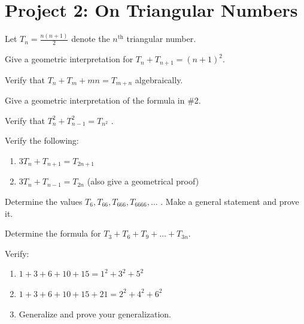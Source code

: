 \documentclass[10pt,]{book}
\theoremstyle{plain}
\theoremstyle{definition}
\theoremstyle{definition}
\theoremstyle{definition}
\theoremstyle{definition}
\numberwithin{equation}{chapter}
\begin{document}
\section[{Project 2: On Triangular Numbers}]{Project 2: On Triangular Numbers}\label{exercises-12}
\hypertarget{p-1171}{}%
Let \(T_{n} = \frac{n\left( n + 1 \right)}{2}\) denote the \(n^{\text{th}}\) triangular number.%
\begin{divisionexercise}{1}\hypertarget{exercise-131}{}
\hypertarget{p-1172}{}%
Give a geometric interpretation for \(T_{n} + T_{n + 1} = \left( n + 1 \right)^{2}.\)%
\end{divisionexercise}%
\begin{divisionexercise}{2}\hypertarget{exercise-132}{}
\hypertarget{p-1173}{}%
Verify that \(T_{n} + T_{m} + mn = T_{m + n}\) algebraically.%
\end{divisionexercise}%
\begin{divisionexercise}{3}\hypertarget{exercise-133}{}
\hypertarget{p-1174}{}%
Give a geometric interpretation of the formula in \#2.%
\end{divisionexercise}%
\begin{divisionexercise}{4}\hypertarget{exercise-134}{}
\hypertarget{p-1175}{}%
Verify that \(T_{n}^{2} + T_{n - 1}^{2} = T_{n^{2}}\) .%
\end{divisionexercise}%
\begin{divisionexercise}{5}\hypertarget{exercise-135}{}
\hypertarget{p-1176}{}%
Verify the following: \leavevmode%
\begin{enumerate}[label=(\alph*)]
\item\hypertarget{li-246}{}\hypertarget{p-1177}{}%
\(3T_{n} + T_{n + 1} = T_{2n + 1}\)%
\item\hypertarget{li-247}{}\hypertarget{p-1178}{}%
\(3T_{n} + T_{n - 1} = T_{2n}\) (also give a geometrical proof)%
\end{enumerate}
%
\end{divisionexercise}%
\begin{divisionexercise}{6}\hypertarget{exercise-136}{}
\hypertarget{p-1179}{}%
Determine the values \(T_{6},T_{66},T_{666},T_{6666},\ldots\) . Make a general statement and prove it.%
\end{divisionexercise}%
\begin{divisionexercise}{7}\hypertarget{exercise-137}{}
\hypertarget{p-1180}{}%
Determine the formula for \(T_{3} + T_{6} + T_{9} + \ldots + T_{3n}.\)%
\end{divisionexercise}%
\begin{divisionexercise}{8}\hypertarget{exercise-138}{}
\hypertarget{p-1181}{}%
Verify: \leavevmode%
\begin{enumerate}[label=(\alph*)]
\item\hypertarget{li-248}{}\hypertarget{p-1182}{}%
\(1 + 3 + 6 + 10 + 15 = 1^{2} + 3^{2} + 5^{2}\)%
\item\hypertarget{li-249}{}\hypertarget{p-1183}{}%
\(1 + 3 + 6 + 10 + 15 + 21 = 2^{2} + 4^{2} + 6^{2}\)%
\item\hypertarget{li-250}{}\hypertarget{p-1184}{}%
Generalize and prove your generalization.%
\end{enumerate}
%
\end{divisionexercise}%
\end{document}
